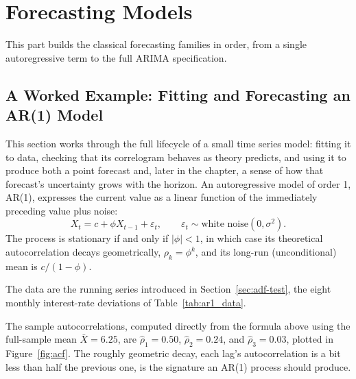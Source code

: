 \documentclass[../ai_in_finance]{subfiles}
\begin{document}
\section{Forecasting Models}

This part builds the classical forecasting families in order, from a single autoregressive term to the full ARIMA specification.

\subsection{A Worked Example: Fitting and Forecasting an AR(1) Model}
\label{sec:ar1-example}

This section works through the full lifecycle of a small time series model: fitting it to data, checking that its correlogram behaves as theory predicts, and using it to produce both a point forecast and, later in the chapter, a sense of how that forecast's uncertainty grows with the horizon. An autoregressive model of order 1, AR(1), expresses the current value as a linear function of the immediately preceding value plus noise:
\begin{equation*}
X_t = c + \phi X_{t-1} + \varepsilon_t, \qquad \varepsilon_t \sim \text{white noise}(0, \sigma^2).
\end{equation*}
The process is stationary if and only if $|\phi| < 1$, in which case its theoretical autocorrelation decays geometrically, $\rho_k = \phi^k$, and its long-run (unconditional) mean is $c/(1-\phi)$.

The data are the running series introduced in Section~\ref{sec:adf-test}, the eight monthly interest-rate deviations of Table~\ref{tab:ar1_data}.

The sample autocorrelations, computed directly from the formula above using the full-sample mean $\bar X = 6.25$, are $\hat\rho_1 = 0.50$, $\hat\rho_2 = 0.24$, and $\hat\rho_3 = 0.03$, plotted in Figure~\ref{fig:acf}. The roughly geometric decay, each lag's autocorrelation is a bit less than half the previous one, is the signature an AR(1) process should produce.
\end{document}
